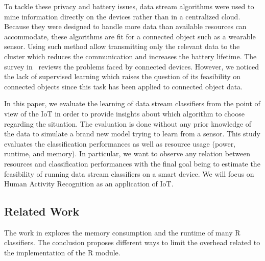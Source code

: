 To tackle these privacy and battery issues, data stream algorithms were used to
mine information directly on the devices rather than in a centralized cloud.
Because they were designed to handle more data than available resources can
accommodate, these algorithms are fit for a connected object such as a wearable
sensor.  Using such method allow transmitting only the relevant data to the
cluster which reduces the communication and increases the battery lifetime. The
survey in~\cite{kejariwal2015} reviews the problems faced by connected devices.
However, we noticed the lack of supervised learning which raises the question
of its feasibility on connected objects since this task has been applied to
connected object data.

In this paper, we evaluate the learning of data stream classifiers from the
point of view of the IoT in order to provide insights about which algorithm
to choose regarding the situation. The evaluation is done without any prior
knowledge of the data to simulate a brand new model trying to learn from a
sensor. This study evaluates the classification performances as well as
resource usage (power, runtime, and memory). In particular, we want to observe
any relation between resources and classification performances with the final
goal being to estimate the feasibility of running data stream classifiers on a
smart device. We will focus on Human Activity Recognition as an application of IoT.


\subsection{Related Work}
The work in \cite{memory_consumption_machine_learning}
explores the memory consumption and
the runtime of many R classifiers. The conclusion proposes different ways to
limit the overhead related to the implementation of the R module.

